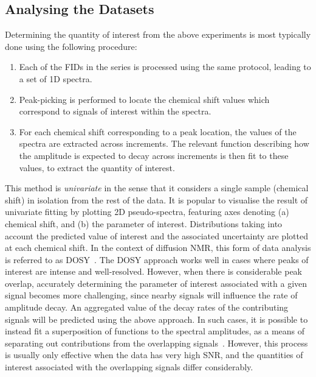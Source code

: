 \subsection{Analysing the Datasets}
Determining the quantity of interest from the above experiments is most
typically done using the following procedure:
\begin{enumerate}
    \item Each of the \acp{FID} in the series is processed using the same protocol,
        leading to a set of \ac{1D} spectra.
    \item Peak-picking is performed to locate the chemical shift values which
        correspond to signals of interest within the spectra.
    \item For each chemical shift corresponding to a peak location, the values
        of the spectra are extracted across increments. The relevant
        function describing how the amplitude is expected to decay across
        increments is then fit to these values, to extract the quantity of
        interest.
\end{enumerate}
This method is \emph{univariate} in the sense that it considers a single sample
(chemical shift) in isolation from the rest of the data.
It is popular to visualise the result of univariate fitting by plotting \ac{2D}
pseudo-spectra, featuring axes denoting (a) chemical shift, and (b)
the parameter of interest. Distributions taking
into account the predicted value of interest and the associated uncertainty
are plotted at each chemical shift.
In the context of diffusion \ac{NMR}, this form of data analysis is
referred to as \ac{DOSY}~\cite{Morris2009b}.
The \ac{DOSY} approach works well in cases where peaks of interest are intense
and well-resolved. However, when there is considerable peak overlap, accurately
determining the parameter of interest associated with a given signal becomes
more challenging, since nearby signals will influence the rate of amplitude
decay. An aggregated value of the decay rates of the contributing signals
will be predicted using the above approach.
In such cases, it is possible to instead fit
a superposition of functions to the spectral amplitudes, as a means of
separating out contributions from the overlapping signals~\cite{Nilsson2006}.
However, this process is usually only effective when the data has very high
\ac{SNR}, and the quantities of interest associated with the overlapping
signals differ considerably.


